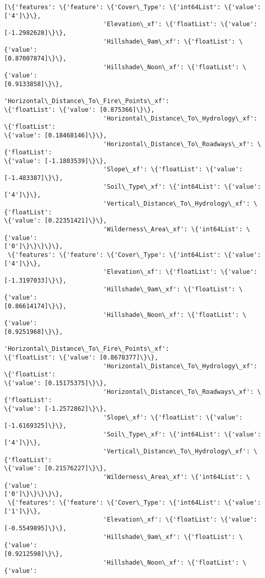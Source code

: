 \documentclass[11pt]{article}
\begin{document}
    \begin{Verbatim}[commandchars=\\\{\}]
[\{'features': \{'feature': \{'Cover\_Type': \{'int64List': \{'value': ['4']\}\},
                           'Elevation\_xf': \{'floatList': \{'value':
[-1.2982628]\}\},
                           'Hillshade\_9am\_xf': \{'floatList': \{'value':
[0.87007874]\}\},
                           'Hillshade\_Noon\_xf': \{'floatList': \{'value':
[0.9133858]\}\},
                           'Horizontal\_Distance\_To\_Fire\_Points\_xf':
\{'floatList': \{'value': [0.875366]\}\},
                           'Horizontal\_Distance\_To\_Hydrology\_xf': \{'floatList':
\{'value': [0.18468146]\}\},
                           'Horizontal\_Distance\_To\_Roadways\_xf': \{'floatList':
\{'value': [-1.1803539]\}\},
                           'Slope\_xf': \{'floatList': \{'value': [-1.483387]\}\},
                           'Soil\_Type\_xf': \{'int64List': \{'value': ['4']\}\},
                           'Vertical\_Distance\_To\_Hydrology\_xf': \{'floatList':
\{'value': [0.22351421]\}\},
                           'Wilderness\_Area\_xf': \{'int64List': \{'value':
['0']\}\}\}\}\},
 \{'features': \{'feature': \{'Cover\_Type': \{'int64List': \{'value': ['4']\}\},
                           'Elevation\_xf': \{'floatList': \{'value':
[-1.3197033]\}\},
                           'Hillshade\_9am\_xf': \{'floatList': \{'value':
[0.86614174]\}\},
                           'Hillshade\_Noon\_xf': \{'floatList': \{'value':
[0.9251968]\}\},
                           'Horizontal\_Distance\_To\_Fire\_Points\_xf':
\{'floatList': \{'value': [0.8678377]\}\},
                           'Horizontal\_Distance\_To\_Hydrology\_xf': \{'floatList':
\{'value': [0.15175375]\}\},
                           'Horizontal\_Distance\_To\_Roadways\_xf': \{'floatList':
\{'value': [-1.2572862]\}\},
                           'Slope\_xf': \{'floatList': \{'value': [-1.6169325]\}\},
                           'Soil\_Type\_xf': \{'int64List': \{'value': ['4']\}\},
                           'Vertical\_Distance\_To\_Hydrology\_xf': \{'floatList':
\{'value': [0.21576227]\}\},
                           'Wilderness\_Area\_xf': \{'int64List': \{'value':
['0']\}\}\}\}\},
 \{'features': \{'feature': \{'Cover\_Type': \{'int64List': \{'value': ['1']\}\},
                           'Elevation\_xf': \{'floatList': \{'value':
[-0.5549895]\}\},
                           'Hillshade\_9am\_xf': \{'floatList': \{'value':
[0.9212598]\}\},
                           'Hillshade\_Noon\_xf': \{'floatList': \{'value':

\end{Verbatim}
\end{document}
